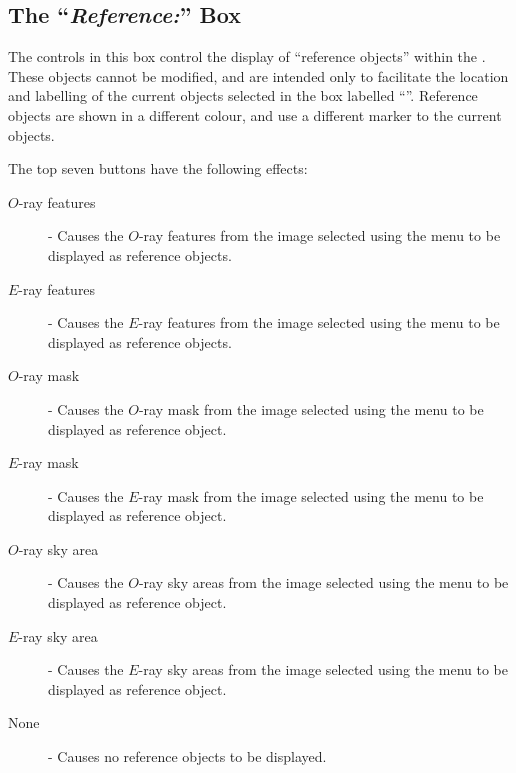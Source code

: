 \documentclass[11pt,nolof]{starlink}
\providecommand{\mylabel}[1] {\xlabel{#1}\label{#1}}
\begin{document}
\subsection {\mylabel{POLKA_REFERENCE}The ``\emph{Reference:}'' Box}
The controls in this box control the display of ``reference objects''
within the . These
objects cannot be modified, and are intended only to facilitate the location
and labelling of the current objects selected in the box labelled
``''. Reference objects are
shown in a different colour, and use a different marker to the current
objects.

The top seven buttons have the following effects:

\begin{description}

\item [$O$-ray features] - Causes the $O$-ray features from the image
selected using the  menu to
be displayed as reference objects.

\item [$E$-ray features] - Causes the $E$-ray features from the image
selected using the  menu to
be displayed as reference objects.

\item [$O$-ray mask] - Causes the $O$-ray mask from the image
selected using the  menu to
be displayed as reference object.

\item [$E$-ray mask] - Causes the $E$-ray mask from the image
selected using the  menu to
be displayed as reference object.

\item [$O$-ray sky area] - Causes the $O$-ray sky areas from the image
selected using the  menu to
be displayed as reference object.

\item [$E$-ray sky area] - Causes the $E$-ray sky areas from the image
selected using the  menu to
be displayed as reference object.

\item [None] - Causes no reference objects to be displayed.

\end{description}
\end{document}
